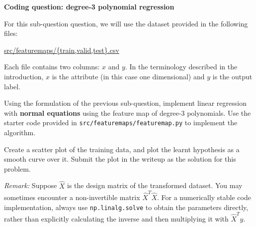 \newpage

\item {} {\bf Coding question: degree-3 polynomial regression}


For this sub-question question, we will use the dataset provided in
the following files:
%
\begin{center}
	\url{src/featuremaps/{train,valid,test}.csv}
\end{center}
%

Each file contains two columns: $x$ and $y$. In the terminology described in the introduction, $x$ is the attribute (in this case one dimensional) and $y$ is the output label.

Using the formulation of the previous sub-question, implement linear regression with \textbf{normal equations} using the feature map of degree-3 polynomials. Use the starter code provided in \texttt{src/featuremaps/featuremap.py} to implement the algorithm.

Create a scatter plot of the training data, and plot the learnt hypothesis as a smooth curve over it. Submit the plot in the writeup as the solution for this problem.

\emph{Remark: } Suppose $\widehat{X}$ is the design matrix of the transformed dataset. You may sometimes encounter a non-invertible matrix $\widehat{X}^T\widehat{X}$. For a numerically stable code implementation, always use \texttt{np.linalg.solve} to obtain the parameters directly, rather than explicitly calculating the inverse and then multiplying it with $\widehat{X}^Ty$.

